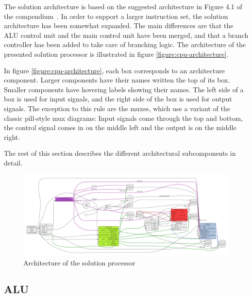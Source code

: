 The solution architecture is based on the suggested architecture in Figure 4.1 of the compendium~\cite[p.115]{compendium}.
In order to support a larger instruction set, the solution architecture has been somewhat expanded.
The main differences are that the ALU control unit and the main control unit have been merged, and that a branch controller has been added to take care of branching logic.
The architecture of the presented solution processor is illustrated in figure \vref{figure:cpu-architecture}.

In figure \vref{figure:cpu-architecture}, each box corresponds to an architecture component.
Larger components have their names written the top of its box.
Smaller components have hovering labels showing their names.
The left side of a box is used for input signals, and the right side of the box is used for output signals.
The exception to this rule are the muxes, which use a variant of the classic pill-style mux diagrams: Input signals come through the top and bottom, the control signal comes in on the middle left and the output is on the middle right.

The rest of this section describes the different architectural subcomponents in detail.

\begin{figure}
	\begin{center}
		\includegraphics[keepaspectratio, height=\textheight, width=\textwidth]{graphics/cpu-architecture/cpu-architecture-color.pdf}
		\caption{Architecture of the solution processor}
		\label{figure:cpu-architecture}
	\end{center}
\end{figure}

\subsection{ALU}


\newpage


